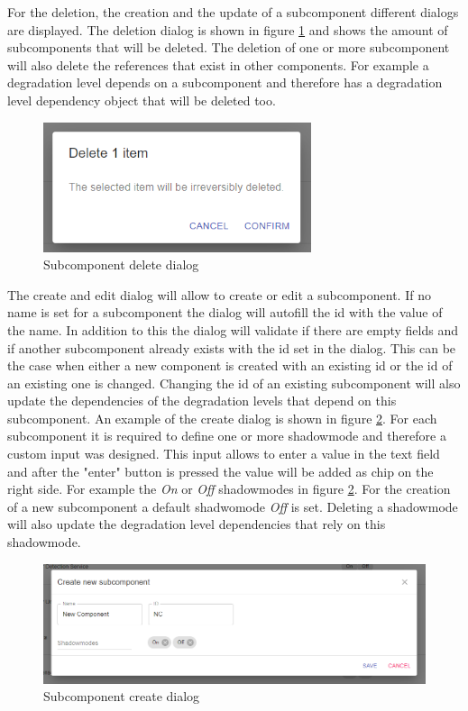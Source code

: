 For the deletion, the creation and the update of a subcomponent different dialogs are displayed.
The deletion dialog is shown in figure \ref{fig:subcomponent_delete_dialog} and shows the amount of subcomponents that will be deleted. The deletion of one or more subcomponent will also delete the references that exist in other components. For example a degradation level depends on a subcomponent and therefore has a degradation level dependency object that will be deleted too.

\begin{figure}[ht]
    \centering
    \includegraphics[width=0.7\textwidth]{img/subcomponents_delete.png}
    \caption{Subcomponent delete dialog}
    \label{fig:subcomponent_delete_dialog}
\end{figure}

The create and edit dialog will allow to create or edit a subcomponent. If no name is set for a subcomponent the dialog will autofill the id with the value of the name. In addition to this the dialog will validate if there are empty fields and if another subcomponent already exists with the id set in the dialog. This can be the case when either a new component is created with an existing id or the id of an existing one is changed. Changing the id of an existing subcomponent will also update the dependencies of the degradation levels that depend on this subcomponent. An example of the create dialog is shown in figure \ref{fig:subcomponent_create_dialog}. For each subcomponent it is required to define one or more shadowmode and therefore a custom input was designed. This input allows to enter a value in the text field and after the "enter" button is pressed the value will be added as chip on the right side. For example the \textit{On} or \textit{Off} shadowmodes in figure \ref{fig:subcomponent_create_dialog}. For the creation of a new subcomponent a default shadwomode \textit{Off} is set. Deleting a shadowmode will also update the degradation level dependencies that rely on this shadowmode.

\begin{figure}[ht]
    \centering
    \includegraphics[width=\textwidth]{img/subcomponents_create.png}
    \caption{Subcomponent create dialog}
    \label{fig:subcomponent_create_dialog}
\end{figure}

